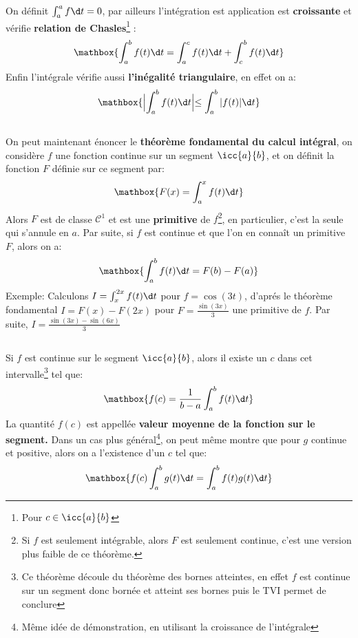 On définit \(\int_{a}^{a} f \d t = 0\), par ailleurs l'intégration est application est \textbf{croissante} et vérifie \textbf{relation de Chasles}\footnote[4]{Pour \(c \in \icc{a}{b}\)} :
\[
   \mathbox{\int_{a}^{b} f(t) \d t = \int_{a}^{c} f(t) \d t + \int_{c}^{b} f(t) \d t}   
\]
Enfin l'intégrale vérifie aussi \textbf{l'inégalité triangulaire}, en effet on a:
\[
   \mathbox{\Bigl| \int_{a}^{b} f(t) \d t \Bigl| \leq \int_{a}^{b} |f(t)| \d t}
\]

\pagebreak

\subsection*{}
On peut maintenant énoncer le \textbf{théorème fondamental du calcul intégral}, on considère \(f\) une fonction continue sur un segment \(\icc{a}{b}\), et on définit la fonction \(F\) définie sur ce segment par:
\[
   \mathbox{F(x) = \int_{a}^{x} f(t) \d t}  
\]
Alors \(F\) est de classe \(\mathscr{C}^1\) et est une \textbf{primitive} de \(f\)\footnote[1]{Si \(f\) est seulement intégrable, alors \(F\) est seulement continue, c'est une version plus faible de ce théorème.}, en particulier, c'est la seule qui s'annule en \(a\).\+
Par suite, si \(f\) est continue et que l'on en connaît un primitive \(F\), alors on a:
\[
   \mathbox{\int_{a}^{b} f(t) \d t = F(b) - F(a)}  
\]
Exemple: Calculons \(I = \int_{x}^{2x} f(t) \d t\) pour \(f = \cos(3t)\), d'aprés le théorème fondamental \(I = F(x) - F(2x)\) pour \(F = \frac{\sin(3x)}{3}\) une primitive de \(f\). Par suite, \(I = \frac{\sin(3x) - \sin(6x)}{3}\)

\subsection*{}
Si \(f\) est continue sur le segment \(\icc{a}{b}\), alors il existe un \(c\) dans cet intervalle\footnote[2]{Ce théorème découle du théorème des bornes atteintes, en effet \(f\) est continue sur un segment donc bornée et atteint ses bornes puis le TVI permet de conclure} tel que:
\[
   \mathbox{f(c) = \frac{1}{b-a}\int_{a}^{b} f(t) \d t}  
\]
La quantité \(f(c)\) est appellée \textbf{valeur moyenne de la fonction sur le segment.}
Dans un cas plus général\footnote[3]{Même idée de démonstration, en utilisant la croissance de l'intégrale}, on peut même montre que pour \(g\) continue et positive, alors on a l'existence d'un \(c\) tel que:
\[
   \mathbox{f(c)\int_{a}^{b} g(t) \d t = \int_{a}^{b} f(t)g(t) \d t}  
\]

